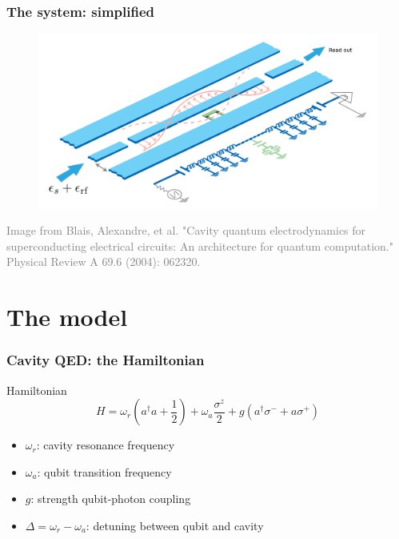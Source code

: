 \documentclass[xcolor=dvipsnames,hyperref={CJKbookmarks=true}]{beamer}
\begin{document}
\begin{frame}
\frametitle{The system: simplified}
\begin{figure}
\centering
\includegraphics[width=\linewidth]{cavity.png}
\end{figure}
\tiny{\textcolor{gray}{Image from Blais, Alexandre, et al. "Cavity quantum electrodynamics for superconducting electrical circuits: An architecture for quantum computation." Physical Review A 69.6 (2004): 062320.\cite{blais2004cavity}}}
\end{frame}

\section{The model}
\begin{frame}
\frametitle{Cavity QED: the Hamiltonian}
\begin{block}{Hamiltonian}
$$H =  \omega_r \left(a^{\dagger} a+ \dfrac{1}{2} \right) +  \omega_a \dfrac{\sigma^{z}}{2}+  g \left(a^{\dagger}\sigma^{-}+a\sigma^{+}\right)$$
\end{block}
\vspace{0.5cm}
\begin{itemize}
\item $\omega_r$: cavity resonance frequency
\vspace{0.3cm}
\item $\omega_a$: qubit transition frequency
\vspace{0.3cm}
\item $g$: strength qubit-photon coupling
\vspace{0.3cm}
\item $\Delta = \omega_r - \omega_a$: detuning between qubit and cavity
\end{itemize}
\end{frame}
\end{document}
